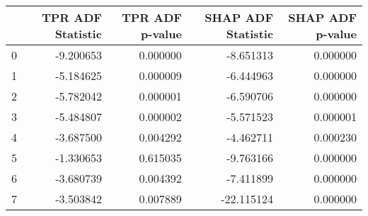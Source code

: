 \begin{tabular}{lrrrr}
\toprule
 & TPR ADF Statistic & TPR ADF p-value & SHAP ADF Statistic & SHAP ADF p-value \\
\midrule
0 & -9.200653 & 0.000000 & -8.651313 & 0.000000 \\
1 & -5.184625 & 0.000009 & -6.444963 & 0.000000 \\
2 & -5.782042 & 0.000001 & -6.590706 & 0.000000 \\
3 & -5.484807 & 0.000002 & -5.571523 & 0.000001 \\
4 & -3.687500 & 0.004292 & -4.462711 & 0.000230 \\
5 & -1.330653 & 0.615035 & -9.763166 & 0.000000 \\
6 & -3.680739 & 0.004392 & -7.411899 & 0.000000 \\
7 & -3.503842 & 0.007889 & -22.115124 & 0.000000 \\
\bottomrule
\end{tabular}
